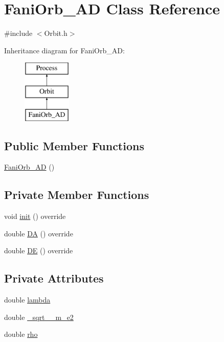 \hypertarget{class_fani_orb___a_d}{}\section{Fani\+Orb\+\_\+\+AD Class Reference}
\label{class_fani_orb___a_d}


{\ttfamily \#include $<$Orbit.\+h$>$}

Inheritance diagram for Fani\+Orb\+\_\+\+AD\+:\begin{figure}[H]
\begin{center}
\leavevmode
\includegraphics[height=3.000000cm]{class_fani_orb___a_d}
\end{center}
\end{figure}
\subsection*{Public Member Functions}
\begin{DoxyCompactItemize}
\item 
\hyperlink{class_fani_orb___a_d_a432479ba69600db08a1ffd2b0d6c3af5}{Fani\+Orb\+\_\+\+AD} ()
\end{DoxyCompactItemize}
\subsection*{Private Member Functions}
\begin{DoxyCompactItemize}
\item 
void \hyperlink{class_fani_orb___a_d_ad75ffb0402507df987305b7a79c8a8d0}{init} () override
\item 
double \hyperlink{class_fani_orb___a_d_a9df0d91b4d07869b53c894da8d60ba14}{DA} () override
\item 
double \hyperlink{class_fani_orb___a_d_a143c3e6457bed241959abb5c939237ac}{DE} () override
\end{DoxyCompactItemize}
\subsection*{Private Attributes}
\begin{DoxyCompactItemize}
\item 
double \hyperlink{class_fani_orb___a_d_ac14ac15d264fb98bad1e422a7b39c1f4}{lambda}
\item 
double \hyperlink{class_fani_orb___a_d_a04763aac6cf9406b335b818736ba8b06}{\+\_\+sqrt\+\_\+\_\+m\+\_\+e2}
\item 
double \hyperlink{class_fani_orb___a_d_a488d6352161ebfe60c19cbe2a13bf946}{rho}
\end{DoxyCompactItemize}
